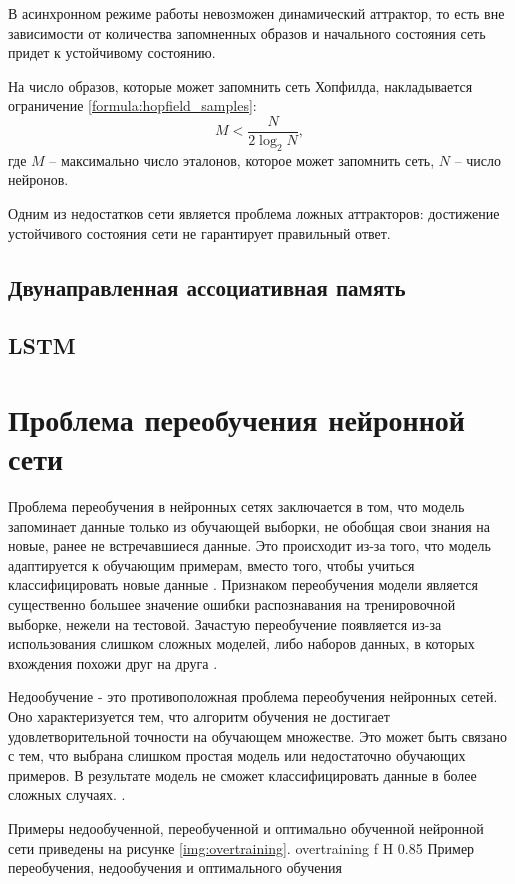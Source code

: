 В асинхронном режиме работы невозможен динамический аттрактор, то есть вне зависимости от количества запомненных образов и начального состояния сеть придет к устойчивому состоянию.

На число образов, которые может запомнить сеть Хопфилда, накладывается ограничение \ref{formula:hopfield_samples}:
\begin{equation}\label{formula:hopfield_samples}
	M < \frac{N}{2\log_2N},
\end{equation}
где $M$ -- максимально число эталонов, которое может запомнить сеть, $N$ -- число нейронов.

Одним из недостатков сети является проблема ложных аттракторов: достижение устойчивого состояния сети не гарантирует правильный ответ.

\subsection{Двунаправленная ассоциативная память}
\subsection{LSTM}


\section{Проблема переобучения нейронной сети}\label{sec:retraining}
Проблема переобучения в нейронных сетях заключается в том, что модель запоминает данные только из обучающей выборки, не обобщая свои знания на новые, ранее не встречавшиеся данные. Это происходит из-за того, что модель адаптируется к обучающим примерам, вместо того, чтобы учиться классифицировать новые данные \cite{overtraining1}. Признаком переобучения модели является существенно большее значение ошибки распознавания на тренировочной выборке, нежели на тестовой. Зачастую переобучение появляется из-за использования слишком сложных моделей, либо наборов данных, в которых вхождения похожи друг на друга \cite{overtraining1}.

Недообучение - это противоположная проблема переобучения нейронных сетей. Оно характеризуется тем, что алгоритм обучения не достигает удовлетворительной точности на обучающем множестве. Это может быть связано с тем, что выбрана слишком простая модель или недостаточно обучающих примеров. В результате модель не сможет классифицировать данные в более сложных случаях. \cite{overtraining1}.

Примеры недообученной, переобученной и оптимально обученной нейронной сети приведены на рисунке \ref{img:overtraining}.
{overtraining} %
{f} %
{H} %
{0.85\textwidth} %
{Пример переобучения, недообучения и оптимального обучения} %

